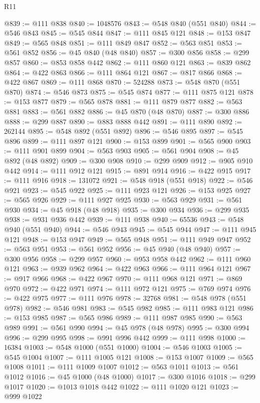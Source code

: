 \begin{lexlean}{R11}
\begin{coremodule}
@839 := @111 @838
@840 := 1048576
@843 := @548 @840 (@551 @840)
@844 := @546 @843
@845 := @545 @844
@847 := @111 @845 @121
@848 := @153 @847
@849 := @565 @848
@851 := @111 @849 @847
@852 := @563 @851
@853 := @561 @852
@856 := @45 @840 (@48 @840)
@857 := @300 @856
@858 := @299 @857
@860 := @853 @858 @442
@862 := @111 @860 @121
@863 := @839 @862
@864 := @422 @863
@866 := @111 @864 @121
@867 := @817 @866
@868 := @422 @867
@869 := @111 @868
@870 := 524288
@873 := @548 @870 (@551 @870)
@874 := @546 @873
@875 := @545 @874
@877 := @111 @875 @121
@878 := @153 @877
@879 := @565 @878
@881 := @111 @879 @877
@882 := @563 @881
@883 := @561 @882
@886 := @45 @870 (@48 @870)
@887 := @300 @886
@888 := @299 @887
@890 := @883 @888 @442
@891 := @111 @890
@892 := 262144
@895 := @548 @892 (@551 @892)
@896 := @546 @895
@897 := @545 @896
@899 := @111 @897 @121
@900 := @153 @899
@901 := @565 @900
@903 := @111 @901 @899
@904 := @563 @903
@905 := @561 @904
@908 := @45 @892 (@48 @892)
@909 := @300 @908
@910 := @299 @909
@912 := @905 @910 @442
@914 := @111 @912 @121
@915 := @891 @914
@916 := @422 @915
@917 := @111 @916
@918 := 131072
@921 := @548 @918 (@551 @918)
@922 := @546 @921
@923 := @545 @922
@925 := @111 @923 @121
@926 := @153 @925
@927 := @565 @926
@929 := @111 @927 @925
@930 := @563 @929
@931 := @561 @930
@934 := @45 @918 (@48 @918)
@935 := @300 @934
@936 := @299 @935
@938 := @931 @936 @442
@939 := @111 @938
@940 := 65536
@943 := @548 @940 (@551 @940)
@944 := @546 @943
@945 := @545 @944
@947 := @111 @945 @121
@948 := @153 @947
@949 := @565 @948
@951 := @111 @949 @947
@952 := @563 @951
@953 := @561 @952
@956 := @45 @940 (@48 @940)
@957 := @300 @956
@958 := @299 @957
@960 := @953 @958 @442
@962 := @111 @960 @121
@963 := @939 @962
@964 := @422 @963
@966 := @111 @964 @121
@967 := @917 @966
@968 := @422 @967
@970 := @111 @968 @121
@971 := @869 @970
@972 := @422 @971
@974 := @111 @972 @121
@975 := @769 @974
@976 := @422 @975
@977 := @111 @976
@978 := 32768
@981 := @548 @978 (@551 @978)
@982 := @546 @981
@983 := @545 @982
@985 := @111 @983 @121
@986 := @153 @985
@987 := @565 @986
@989 := @111 @987 @985
@990 := @563 @989
@991 := @561 @990
@994 := @45 @978 (@48 @978)
@995 := @300 @994
@996 := @299 @995
@998 := @991 @996 @442
@999 := @111 @998
@1000 := 16384
@1003 := @548 @1000 (@551 @1000)
@1004 := @546 @1003
@1005 := @545 @1004
@1007 := @111 @1005 @121
@1008 := @153 @1007
@1009 := @565 @1008
@1011 := @111 @1009 @1007
@1012 := @563 @1011
@1013 := @561 @1012
@1016 := @45 @1000 (@48 @1000)
@1017 := @300 @1016
@1018 := @299 @1017
@1020 := @1013 @1018 @442
@1022 := @111 @1020 @121
@1023 := @999 @1022

\end{coremodule}
\end{lexlean}
